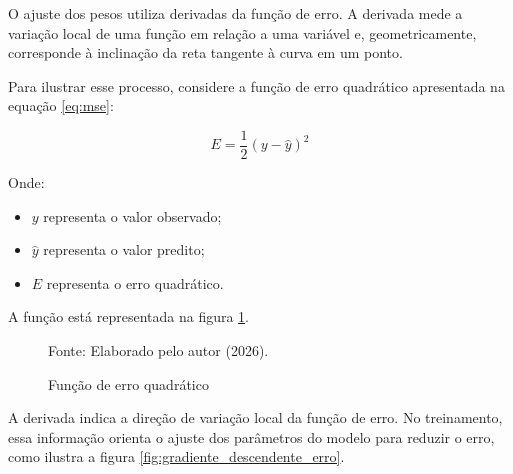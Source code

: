 O ajuste dos pesos utiliza derivadas da função de erro. A derivada mede a variação local de uma função em relação a uma variável e, geometricamente, corresponde à inclinação da reta tangente à curva em um ponto.

Para ilustrar esse processo, considere a função de erro quadrático apresentada na equação \ref{eq:mse}:

\begin{equation}
	E = \frac{1}{2}(y-\hat{y})^2
	\label{eq:mse}
\end{equation}

Onde:
\begin{itemize}
	\item $y$ representa o valor observado;
	\item $\hat{y}$ representa o valor predito;
	\item $E$ representa o erro quadrático.
\end{itemize}

A função está representada na figura \ref{fig:erroquadratico}.

\begin{figure}[htb]
	\centering
	\captionsetup{justification=centering}
	\caption{Função de erro quadrático}
	\vspace{5pt}
	\label{fig:erroquadratico}

	\vspace{0.2cm}
	\footnotesize Fonte: Elaborado pelo autor (2026).
\end{figure}

A derivada indica a direção de variação local da função de erro. No treinamento, essa informação orienta o ajuste dos parâmetros do modelo para reduzir o erro, como ilustra a figura \ref{fig:gradiente_descendente_erro}.

